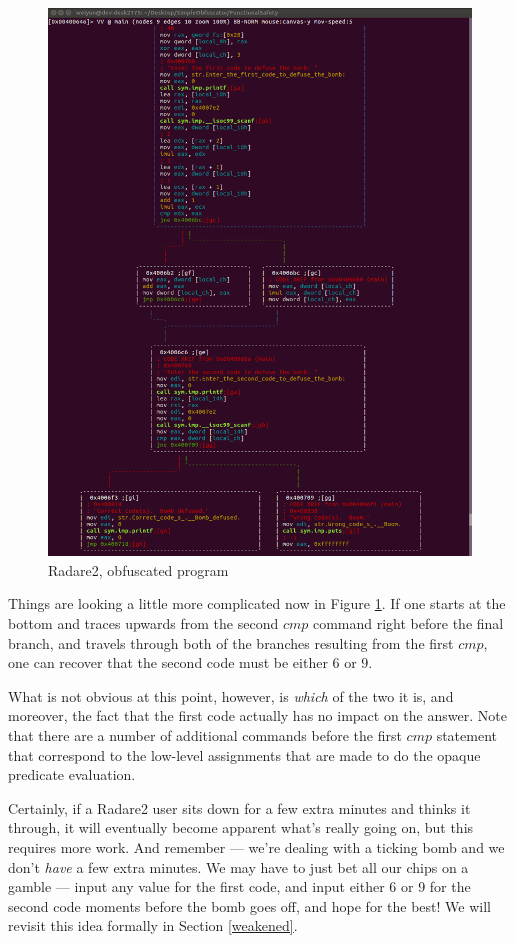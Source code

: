 \documentclass[12pt,notitlepage]{report}
\theoremstyle{plain}
\theoremstyle{definition}
\numberwithin{equation}{section}
\begin{document}
\begin{figure}[H]
    \centering
\includegraphics[scale=0.4]{r2obfuscated}
    \caption{Radare2, obfuscated program}
    \label{fig:radare2}
\end{figure}

Things are looking a little more complicated now in Figure \ref{fig:radare2}.  If one starts at the bottom and traces upwards from the second $cmp$ command right before the final branch, and travels through both of the branches resulting from the first $cmp$, one can recover that the second code must be either $6$ or $9$.

\par What is not obvious at this point, however, is \emph{which} of the two it is, and moreover, the fact that the first code actually has no impact on the answer.  Note that there are a number of additional commands before the first $cmp$ statement that correspond to the low-level assignments that are made to do the opaque predicate evaluation.  \par Certainly, if a Radare2 user sits down for a few extra minutes and thinks it through, it will eventually become apparent what's really going on, but this requires more work.  And remember --- we're dealing with a ticking bomb and we don't \emph{have} a few extra minutes.  We may have to just bet all our chips on a gamble --- input any value for the first code, and input either 6 or 9 for the second code moments before the bomb goes off, and hope for the best!  We will revisit this idea formally in Section \ref{weakened}.
\end{document}
